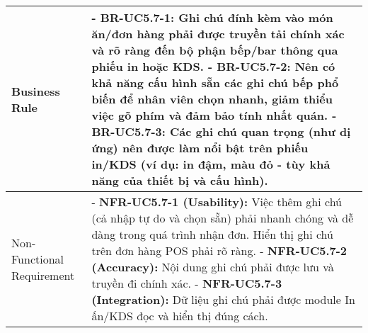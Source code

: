 \begin{longtable}{|m{4cm}|p{11cm}|}
\hline
Business Rule & - \textbf{BR-UC5.7-1:} Ghi chú đính kèm vào món ăn/đơn hàng phải được truyền tải chính xác và rõ ràng đến bộ phận bếp/bar thông qua phiếu in hoặc KDS. \newline - \textbf{BR-UC5.7-2:} Nên có khả năng cấu hình sẵn các ghi chú bếp phổ biến để nhân viên chọn nhanh, giảm thiểu việc gõ phím và đảm bảo tính nhất quán. \newline - \textbf{BR-UC5.7-3:} Các ghi chú quan trọng (như dị ứng) nên được làm nổi bật trên phiếu in/KDS (ví dụ: in đậm, màu đỏ - tùy khả năng của thiết bị và cấu hình). \\
\hline
Non-Functional Requirement & - \textbf{NFR-UC5.7-1 (Usability):} Việc thêm ghi chú (cả nhập tự do và chọn sẵn) phải nhanh chóng và dễ dàng trong quá trình nhận đơn. Hiển thị ghi chú trên đơn hàng POS phải rõ ràng. \newline - \textbf{NFR-UC5.7-2 (Accuracy):} Nội dung ghi chú phải được lưu và truyền đi chính xác. \newline - \textbf{NFR-UC5.7-3 (Integration):} Dữ liệu ghi chú phải được module In ấn/KDS đọc và hiển thị đúng cách. \\
\hline
\end{longtable}

